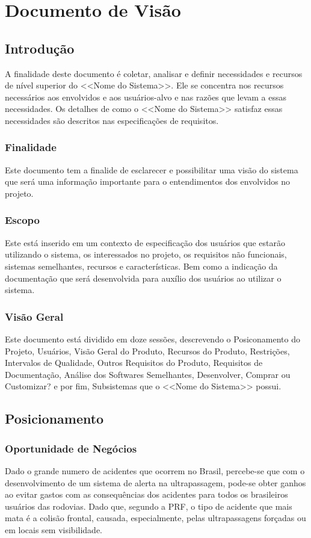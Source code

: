 \chapter[Documento de Visão]{Documento de Visão}

\section{Introdução}
A finalidade deste documento é coletar, analisar e definir necessidades e recursos de nível superior do <<Nome do Sistema>>. Ele se concentra nos recursos necessários aos envolvidos e aos usuários-alvo e nas razões que levam a essas necessidades. Os detalhes de como o <<Nome do Sistema>> satisfaz essas necessidades são descritos nas especificações de requisitos.

\subsection{Finalidade}
Este documento tem a finalide de  esclarecer e possibilitar uma visão do sistema que será uma informação importante para o entendimentos dos envolvidos no projeto.
\subsection{Escopo}
Este está inserido em um contexto de especificação dos usuários que estarão utilizando o sistema, os interessados no projeto, os requisitos não funcionais, sistemas semelhantes, recursos e características. Bem como a indicação da documentação que será desenvolvida para auxílio dos usuários ao utilizar o sistema.
\subsection{Visão Geral}
Este documento está dividido em doze sessões, descrevendo o Posiconamento do Projeto, Usuários, Visão Geral do Produto, Recursos do Produto, Restrições, Intervalos de Qualidade, Outros Requisitos do Produto, Requisitos de Documentação, Análise dos Softwares Semelhantes, Desenvolver, Comprar ou Customizar? e por fim, Subsistemas que o <<Nome do Sistema>> possui.

\section{Posicionamento}

\subsection{Oportunidade de Negócios}
Dado o grande numero de acidentes que ocorrem no Brasil, percebe-se que com o
desenvolvimento de um sistema de alerta na ultrapassagem, pode-se obter
ganhos ao evitar gastos com as consequências dos acidentes para todos os
brasileiros usuários das rodovias. Dado que, segundo a PRF, o tipo de acidente
que mais mata é a colisão frontal, causada, especialmente, pelas ultrapassagens
forçadas ou em locais sem visibilidade\cite{prf}.

